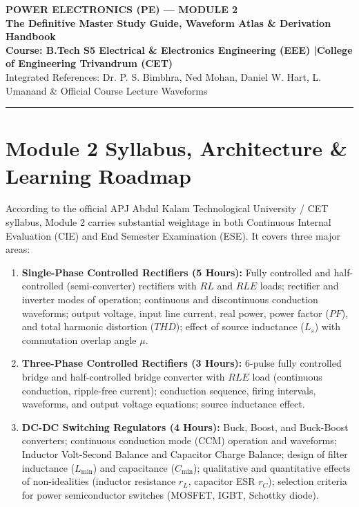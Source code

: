 \documentclass[11pt,a4paper]{article}
\begin{document}
\begin{center}
  {\huge\bfseries\color{navyprimary} POWER ELECTRONICS (PE) --- MODULE 2}\\[1.5ex]
  {\Large\bfseries\color{accentblue} The Definitive Master Study Guide, Waveform Atlas \& Derivation Handbook}\\[1.5ex]
  {\normalsize\bfseries Course: B.Tech S5 Electrical \& Electronics Engineering (EEE) \quad|\quad College of Engineering Trivandrum (CET)}\\[0.8ex]
  {\small Integrated References: Dr. P. S. Bimbhra, Ned Mohan, Daniel W. Hart, L. Umanand \& Official Course Lecture Waveforms}
\end{center}
\vspace{-1em}
\noindent\textcolor{accentblue}{\rule{\textwidth}{1.5pt}}
\vspace{0.5em}

\tableofcontents
\newpage

\section{Module 2 Syllabus, Architecture \& Learning Roadmap}

According to the official APJ Abdul Kalam Technological University / CET syllabus, Module 2 carries substantial weightage in both Continuous Internal Evaluation (CIE) and End Semester Examination (ESE). It covers three major areas:

\begin{enumerate}[leftmargin=*]
  \item \textbf{Single-Phase Controlled Rectifiers (5 Hours):} Fully controlled and half-controlled (semi-converter) rectifiers with $RL$ and $RLE$ loads; rectifier and inverter modes of operation; continuous and discontinuous conduction waveforms; output voltage, input line current, real power, power factor ($PF$), and total harmonic distortion ($THD$); effect of source inductance ($L_s$) with commutation overlap angle $\mu$.
  \item \textbf{Three-Phase Controlled Rectifiers (3 Hours):} 6-pulse fully controlled bridge and half-controlled bridge converter with $RLE$ load (continuous conduction, ripple-free current); conduction sequence, firing intervals, waveforms, and output voltage equations; source inductance effect.
  \item \textbf{DC-DC Switching Regulators (4 Hours):} Buck, Boost, and Buck-Boost converters; continuous conduction mode (CCM) operation and waveforms; Inductor Volt-Second Balance and Capacitor Charge Balance; design of filter inductance ($L_{\min}$) and capacitance ($C_{\min}$); qualitative and quantitative effects of non-idealities (inductor resistance $r_L$, capacitor ESR $r_C$); selection criteria for power semiconductor switches (MOSFET, IGBT, Schottky diode).
\end{enumerate}
\end{document}
